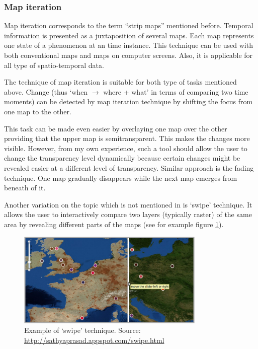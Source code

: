 \documentclass[a4paper,12pt]{book}
\begin{document}
\subsubsection{Map iteration}
Map iteration corresponds to the term ``strip maps'' mentioned before.
Temporal information is presented as a juxtaposition of several maps.
Each map represents one state of a phenomenon at an time instance.
This technique can be used with both conventional maps and maps on computer screens.
Also, it is applicable for all type of spatio-temporal data.

The technique of map iteration is suitable
for both type of tasks mentioned above.
Change (thus `when $\rightarrow$ where + what' in terms of comparing two time moments)
can be detected by map iteration technique by shifting the focus from one map to the other.

This task can be made even easier by overlaying one map over the other providing that the upper map is semitransparent.
This makes the changes more visible.
However, from my own experience, such a tool should allow the user to change the transparency level dynamically
because certain changes might be revealed easier at a different level of transparency.
Similar approach is the fading technique.
One map gradually disappears while the next map emerges from beneath of it.

Another variation on the topic which is not mentioned in \cite{andrienko2003exploratory}
is `swipe' technique.
It allows the user to interactively compare two layers (typically raster)
of the same area by revealing different parts of the maps (see for example figure \ref{fig:swipe}).


\begin{figure}[h!]
  \centering
  \includegraphics[width=0.8\textwidth]{./images/swipe_example.png}
  \caption{Example of `swipe' technique. Source: \url{http://sathyaprasad.appspot.com/swipe.html}}
  \label{fig:swipe}
\end{figure}
\end{document}

